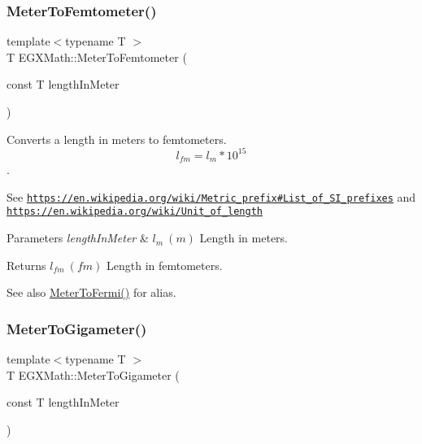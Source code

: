 \subsubsection{\texorpdfstring{Meter\+To\+Femtometer()}{MeterToFemtometer()}}
{\footnotesize\ttfamily template$<$typename T $>$ \\
T E\+G\+X\+Math\+::\+Meter\+To\+Femtometer (\begin{DoxyParamCaption}\item[{const T}]{length\+In\+Meter }\end{DoxyParamCaption})}



Converts a length in meters to femtometers. \[ l_{fm}=l_{m} * 10^{15} \]. 

See \href{https://en.wikipedia.org/wiki/Metric_prefix#List_of_SI_prefixes}{\tt https\+://en.\+wikipedia.\+org/wiki/\+Metric\+\_\+prefix\#\+List\+\_\+of\+\_\+\+S\+I\+\_\+prefixes} and \href{https://en.wikipedia.org/wiki/Unit_of_length}{\tt https\+://en.\+wikipedia.\+org/wiki/\+Unit\+\_\+of\+\_\+length} 
\begin{DoxyParams}{Parameters}
{\em length\+In\+Meter} & $ l_{m}\ (m)$ Length in meters. \\
\hline
\end{DoxyParams}
\begin{DoxyReturn}{Returns}
$ l_{fm}\ (fm)$ Length in femtometers. 
\end{DoxyReturn}
\begin{DoxySeeAlso}{See also}
\mbox{\hyperlink{group___e_g_x_math-_conversions-_length_conversions-_s_i-_meter-_non-_s_i_ga2cf89a4a80da02e3e3c82e844095acfe}{Meter\+To\+Fermi()}} for alias. 
\end{DoxySeeAlso}
\mbox{\label{group___e_g_x_math-_conversions-_length_conversions-_s_i-_meter-_s_i_ga045300d4eccd668680eab86f9262cc81}} 
\subsubsection{\texorpdfstring{Meter\+To\+Gigameter()}{MeterToGigameter()}}
{\footnotesize\ttfamily template$<$typename T $>$ \\
T E\+G\+X\+Math\+::\+Meter\+To\+Gigameter (\begin{DoxyParamCaption}\item[{const T}]{length\+In\+Meter }\end{DoxyParamCaption})}



